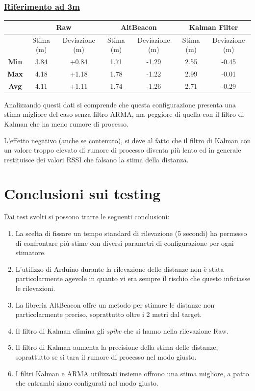 \subsubsection{\underline{Riferimento ad 3m}}
\begin{center}
	\begin{tabular}{|c|c|c|c|c|c|c|}
		\hline 
		& \multicolumn{2}{|c|}{\textbf{Raw}} &\multicolumn{2}{|c|}{\textbf{AltBeacon}} &\multicolumn{2}{|c|}{\textbf{Kalman Filter}}\\ 
		\hline 
		& Stima (m) & Deviazione (m) & Stima (m) & Deviazione (m) & Stima (m)& Deviazione (m)\\ 
		\hline 
		\textbf{Min} & 3.84	& +0.84 & 1.71	& -1.29 & 2.55	& -0.45 \\ 
		\hline 
		\textbf{Max} & 4.18	& +1.18 & 1.78	& -1.22 & 2.99	& -0.01	\\ 
		\hline 
		\textbf{Avg} & 4.11	& +1.11 & 1.74 	& -1.26 & 2.71 	& -0.29	\\ 
		\hline 
	\end{tabular}
\end{center}

Analizzando questi dati si comprende che questa configurazione presenta una stima migliore del caso senza filtro ARMA, ma peggiore di quella con il filtro di Kalman che ha meno rumore di processo.

L'effetto negativo (anche se contenuto), si deve al fatto che il filtro di Kalman con un valore troppo elevato di rumore di processo diventa più lento ed in generale restituisce dei valori RSSI che falsano la stima della distanza.

\newpage
\section{Conclusioni sui testing}
Dai test svolti si possono trarre le seguenti conclusioni:
\begin{enumerate}
	\item La scelta di fissare un tempo standard di rilevazione (5 secondi) ha permesso di confrontare più stime con diversi parametri di configurazione per ogni stimatore.
	\item L'utilizzo di Arduino durante la rilevazione delle distanze non è stata particolarmente agevole in quanto vi era sempre il rischio che questo inficiasse le rilevazioni.
	\item La libreria AltBeacon offre un metodo per stimare le distanze non particolarmente preciso, soprattutto oltre i 2 metri dal target.
	\item Il filtro di Kalman elimina gli \textit{spike} che si hanno nella rilevazione Raw.
	\item Il filtro di Kalman aumenta la precisione della stima delle distanze, soprattutto se si tara il rumore di processo nel modo giusto.
	\item I filtri Kalman e ARMA utilizzati insieme offrono una stima migliore, a patto che entrambi siano configurati nel modo giusto.	
\end{enumerate}

